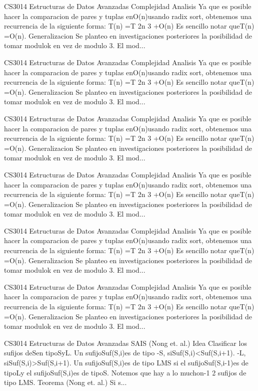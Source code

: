 \begin{description}[leftmargin=!,labelwidth=4.2em,style=nextline]
\item[Pag. 39] CS3014 Estructuras de Datos Avanzadas Complejidad Analisis Ya que es posible hacer la comparacion de pares y tuplas enO(n)usando radix sort, obtenemos una recurrencia de la siguiente forma: T(n) =T  2n 3   +O(n) Es sencillo notar queT(n) =O(n). Generalizacion Se planteo en investigaciones posteriores la posibilidad de tomar modulok en vez de modulo 3. El mod...
\item[Pag. 40] CS3014 Estructuras de Datos Avanzadas Complejidad Analisis Ya que es posible hacer la comparacion de pares y tuplas enO(n)usando radix sort, obtenemos una recurrencia de la siguiente forma: T(n) =T  2n 3   +O(n) Es sencillo notar queT(n) =O(n). Generalizacion Se planteo en investigaciones posteriores la posibilidad de tomar modulok en vez de modulo 3. El mod...
\item[Pag. 41] CS3014 Estructuras de Datos Avanzadas Complejidad Analisis Ya que es posible hacer la comparacion de pares y tuplas enO(n)usando radix sort, obtenemos una recurrencia de la siguiente forma: T(n) =T  2n 3   +O(n) Es sencillo notar queT(n) =O(n). Generalizacion Se planteo en investigaciones posteriores la posibilidad de tomar modulok en vez de modulo 3. El mod...
\item[Pag. 42] CS3014 Estructuras de Datos Avanzadas Complejidad Analisis Ya que es posible hacer la comparacion de pares y tuplas enO(n)usando radix sort, obtenemos una recurrencia de la siguiente forma: T(n) =T  2n 3   +O(n) Es sencillo notar queT(n) =O(n). Generalizacion Se planteo en investigaciones posteriores la posibilidad de tomar modulok en vez de modulo 3. El mod...
\item[Pag. 43] CS3014 Estructuras de Datos Avanzadas Complejidad Analisis Ya que es posible hacer la comparacion de pares y tuplas enO(n)usando radix sort, obtenemos una recurrencia de la siguiente forma: T(n) =T  2n 3   +O(n) Es sencillo notar queT(n) =O(n). Generalizacion Se planteo en investigaciones posteriores la posibilidad de tomar modulok en vez de modulo 3. El mod...
\item[Pag. 44] CS3014 Estructuras de Datos Avanzadas Complejidad Analisis Ya que es posible hacer la comparacion de pares y tuplas enO(n)usando radix sort, obtenemos una recurrencia de la siguiente forma: T(n) =T  2n 3   +O(n) Es sencillo notar queT(n) =O(n). Generalizacion Se planteo en investigaciones posteriores la posibilidad de tomar modulok en vez de modulo 3. El mod...
\item[Pag. 45] CS3014 Estructuras de Datos Avanzadas SAIS (Nong et. al.) Idea Clasificar los sufijos deSen tipoSyL. Un sufijoSuf(S,i)es de tipo -S, siSuf(S,i)<Suf(S,i+1). -L, siSuf(S,i)>Suf(S,i+1). Un sufijoSuf(S,i)es de tipo LMS si el sufijoSuf(S,i-1)es de tipoLy el sufijoSuf(S,i)es de tipoS. Notemos que hay a lo muchon-1 2 sufijos de tipo LMS. Teorema (Nong et. al.) Si s...

\end{description}
